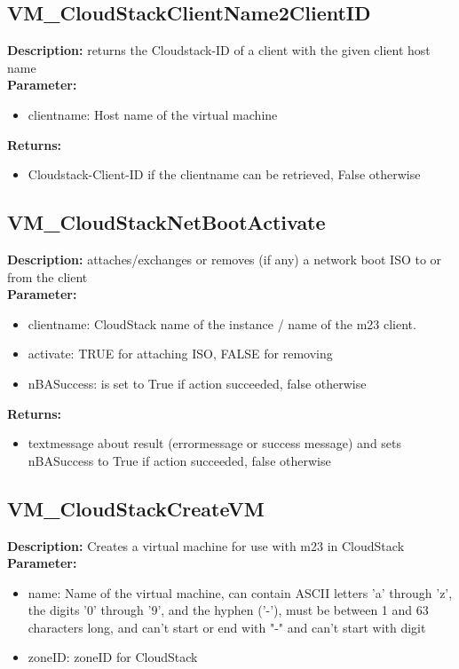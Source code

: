 \subsection{VM\_CloudStackClientName2ClientID}
\textbf{Description:} returns the Cloudstack-ID of a client with the given client host name\\
\textbf{Parameter:}
\begin{itemize}
\item clientname: Host name of the virtual machine
\end{itemize}
\textbf{Returns:}
\begin{itemize}
\item Cloudstack-Client-ID if the clientname can be retrieved, False otherwise 
\end{itemize}

\subsection{VM\_CloudStackNetBootActivate}
\textbf{Description:} attaches/exchanges or removes (if any) a network boot ISO to or from the client\\
\textbf{Parameter:}
\begin{itemize}
\item clientname: CloudStack name of the instance / name of the m23 client.
\item activate: TRUE for attaching ISO, FALSE for removing
\item nBASuccess: is set to True if action succeeded, false otherwise
\end{itemize}
\textbf{Returns:}
\begin{itemize}
\item textmessage about result (errormessage or success message) and sets nBASuccess to True if action succeeded, false otherwise
\end{itemize}

\subsection{VM\_CloudStackCreateVM}
\textbf{Description:} Creates a virtual machine for use with m23 in CloudStack\\
\textbf{Parameter:}
\begin{itemize}
\item name: Name of the virtual machine, can contain ASCII letters 'a' through 'z', the digits '0' through '9', and the hyphen ('-'), must be between 1 and 63 characters long, and can't start or end with "-" and can't start with digit
\item zoneID: zoneID for CloudStack
\end{itemize}

